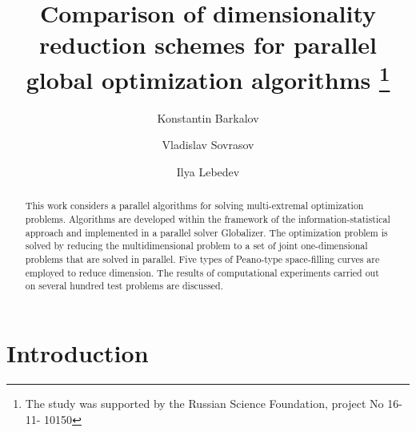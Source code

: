 \documentclass[runningheads]{llncs}
\begin{document}
\setlength{\abovedisplayskip}{3pt}
\setlength{\belowdisplayskip}{3pt}
%
\title{Comparison of dimensionality reduction schemes for parallel global optimization
algorithms 
\thanks{The study was supported by the Russian Science Foundation, project No 16-11-
10150}}
%
%
\author{Konstantin Barkalov \and
Vladislav Sovrasov \and
Ilya Lebedev}
%
%
%
\maketitle              %
%
\begin{abstract}
This work considers a parallel algorithms for solving multi-extremal optimization problems.
Algorithms are developed within the framework of the information-statistical approach and
implemented in a parallel solver Globalizer. The optimization problem is solved by reducing
the multidimensional problem to a set of joint one-dimensional problems that are solved in
parallel. Five types of Peano-type space-filling curves are employed to reduce dimension. The
results of computational experiments carried out on several hundred test problems are discussed.

\end{abstract}

\section{Introduction}\label{sec:intro}
\end{document}
